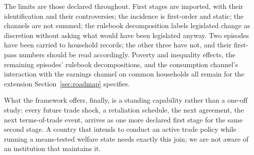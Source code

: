 The limits are those declared throughout. First stages are imported,
with their identification and their controversies; the incidence is
first-order and static; the channels are not summed; the rulebook
decomposition labels legislated change as discretion without asking
what would have been legislated anyway. Two episodes have been carried to household records; the other three
have not, and their first-pass numbers should be read accordingly. Poverty
and inequality effects, the remaining episodes' rulebook
decompositions, and the consumption channel's interaction with the
earnings channel on common households all remain for the extension
Section~\ref{sec:roadmap} specifies.

What the framework offers, finally, is a standing capability rather
than a one-off study: every future trade shock, a retaliation
schedule, the next agreement, the next terms-of-trade event, arrives
as one more declared first stage for the same second stage. A country
that intends to conduct an active trade policy while running a
means-tested welfare state needs exactly this join; we are not aware
of an institution that maintains it.
